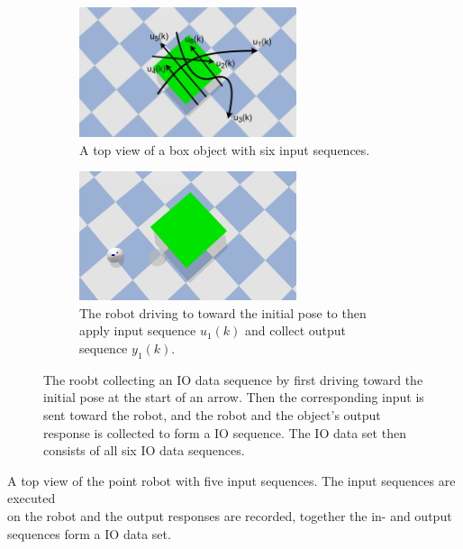 \begin{figure}[H]\ContinuedFloat
    \centering
    \begin{subfigure}{\textwidth}
    \centering
    \includegraphics[width=0.7\textwidth]{figures/required_background/collect_io_data_object}
    \caption{A top view of a box object with six input sequences.}%
    \label{subfig:collect_io_object_arrows}
    \end{subfigure}

    \begin{subfigure}{\textwidth}
    \centering
    \includegraphics[width=0.7\textwidth]{figures/required_background/collect_io_data_obj_and_robot}
    \caption{The robot driving to toward the initial pose to then apply input sequence $u_1(k)$ and collect output sequence $y_1(k)$.}%
    \label{subfig:collect_io_object_goto_init}
    \end{subfigure}
    \caption{The roobt collecting an \ac{IO} data sequence by first driving toward the initial pose at the start of an arrow. Then the corresponding input is sent toward the robot, and the robot and the object's output response is collected to form a \ac{IO} sequence. The \ac{IO} data set then consists of all six \ac{IO} data sequences.}%
    \label{fig:collect_io_object}
\end{figure}

A top view of the point robot with five input sequences. The input sequences are executed\\on the robot and the output responses are recorded, together the in- and output sequences form a \ac{IO} data set.

